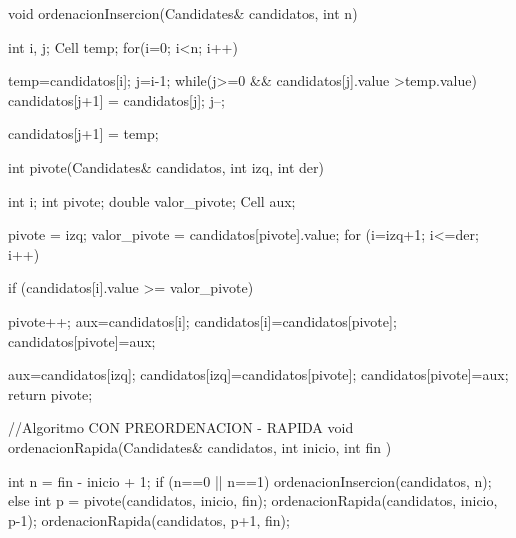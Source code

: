 void ordenacionInsercion(Candidates& candidatos, int n)
{
 	int i, j; 
	Cell temp;
 	for(i=0; i<n; i++)
 	{
 		temp=candidatos[i];
 		j=i-1;
 		while(j>=0 && candidatos[j].value >temp.value)
 		{
 			candidatos[j+1] = candidatos[j];
 			j--;
 		}

		candidatos[j+1] = temp;
	}
}

int pivote(Candidates& candidatos, int izq, int der)
{
	int i;
	int pivote;
	double valor_pivote;
    Cell aux;

    pivote = izq;
    valor_pivote = candidatos[pivote].value;
    for (i=izq+1; i<=der; i++){
        if (candidatos[i].value >= valor_pivote){
                pivote++;
                aux=candidatos[i];
                candidatos[i]=candidatos[pivote];
                candidatos[pivote]=aux;

        }
    }
    aux=candidatos[izq];
    candidatos[izq]=candidatos[pivote];
    candidatos[pivote]=aux;
    return pivote;
}


//Algoritmo CON PREORDENACION - RAPIDA
void ordenacionRapida(Candidates& candidatos, int inicio, int fin )
{
	int n = fin - inicio + 1;
	if (n==0 || n==1)
	{
		ordenacionInsercion(candidatos, n);
	}
	else
	{
		int p = pivote(candidatos, inicio, fin);
		ordenacionRapida(candidatos, inicio, p-1);
		ordenacionRapida(candidatos, p+1, fin);
	}
	
}
